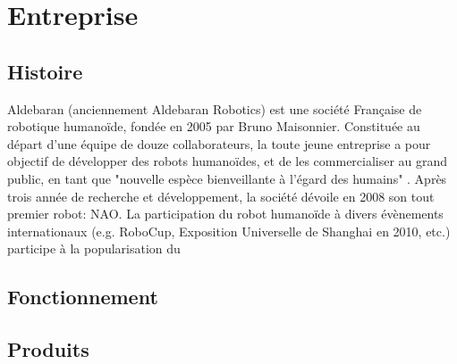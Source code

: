\chapter*{Entreprise}
\label{Entreprise}
\thispagestyle{fancy}

\section{Histoire}
\label{Entreprise: histoire}
Aldebaran (anciennement Aldebaran Robotics) est une société Française de robotique humanoïde, fondée en 2005 par Bruno Maisonnier. 
Constituée au départ d'une équipe de douze collaborateurs, la toute jeune entreprise a pour objectif de développer des robots humanoïdes, et de les commercialiser au grand public, en tant que "nouvelle espèce bienveillante à l'égard des humains" . Après trois année de recherche et développement, la société dévoile en 2008 son tout premier robot: NAO. La participation du robot humanoïde à divers évènements internationaux (e.g. RoboCup, Exposition Universelle de Shanghai en 2010, etc.) participe à la popularisation du

\section{Fonctionnement}

\section{Produits}